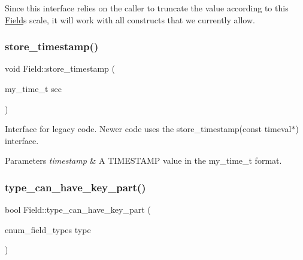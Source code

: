 \begin{DoxyCode}{0}
\end{DoxyCode}


Since this interface relies on the caller to truncate the value according to this \mbox{\hyperlink{classField}{Field}}\textquotesingle{}s scale, it will work with all constructs that we currently allow. \mbox{\label{classField_a34ceda8f27d73b5a547221598ba64db4}} 
\subsubsection{\texorpdfstring{store\+\_\+timestamp()}{store\_timestamp()}\hspace{0.1cm}{\footnotesize\ttfamily [2/2]}}
{\footnotesize\ttfamily void Field\+::store\+\_\+timestamp (\begin{DoxyParamCaption}\item[{my\+\_\+time\+\_\+t}]{sec }\end{DoxyParamCaption})\hspace{0.3cm}{\ttfamily [inline]}}

Interface for legacy code. Newer code uses the store\+\_\+timestamp(const timeval$\ast$) interface.


\begin{DoxyParams}{Parameters}
{\em timestamp} & A T\+I\+M\+E\+S\+T\+A\+MP value in the my\+\_\+time\+\_\+t format. \\
\hline
\end{DoxyParams}
\mbox{\label{classField_a9119fec4aa570a98879146f00b48c90d}} 
\subsubsection{\texorpdfstring{type\+\_\+can\+\_\+have\+\_\+key\+\_\+part()}{type\_can\_have\_key\_part()}}
{\footnotesize\ttfamily bool Field\+::type\+\_\+can\+\_\+have\+\_\+key\+\_\+part (\begin{DoxyParamCaption}\item[{enum\+\_\+field\+\_\+types}]{type }\end{DoxyParamCaption})\hspace{0.3cm}{\ttfamily [static]}}

